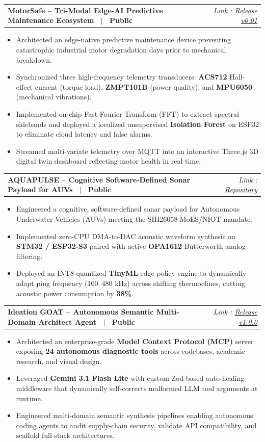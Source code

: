\documentclass[letterpaper,10pt]{article}
\makeatletter
\newcommand{\resumeProjectHeading}[2]{
  \vspace{-2pt}\item
    \begin{tabular*}{\linewidth}[t]{l@{\extracolsep{\fill}}r}
      \textbf{#1} & \textit{\small #2} \\
    \end{tabular*}\vspace{-3pt}
}
\newcommand{\resumeItemListStart}{\begin{itemize}[leftmargin=14pt, labelsep=4pt, itemsep=0.5pt, parsep=0pt]}
\newcommand{\resumeItemListEnd}{\end{itemize}\vspace{-3pt}}
\makeatother
\begin{document}
    \resumeProjectHeading
      {MotorSafe -- Tri-Modal Edge-AI Predictive Maintenance Ecosystem \ $|$ \ Public}{Link : \href{https://github.com/seeramsujay/motor-safe/releases/tag/v0.01}{Release v0.01}}
      \resumeItemListStart
        \item{Architected an edge-native predictive maintenance device preventing catastrophic industrial motor degradation days prior to mechanical breakdown.}
        \item{Synchronized three high-frequency telemetry transducers: \textbf{ACS712} Hall-effect current (torque load), \textbf{ZMPT101B} (power quality), and \textbf{MPU6050} (mechanical vibrations).}
        \item{Implemented on-chip Fast Fourier Transform (FFT) to extract spectral sidebands and deployed a localized unsupervised \textbf{Isolation Forest} on ESP32 to eliminate cloud latency and false alarms.}
        \item{Streamed multi-variate telemetry over MQTT into an interactive Three.js 3D digital twin dashboard reflecting motor health in real time.}
      \resumeItemListEnd

    \resumeProjectHeading
      {AQUAPULSE -- Cognitive Software-Defined Sonar Payload for AUVs \ $|$ \ Public}{Link : \href{https://github.com/seeramsujay/aqua-pulse}{Repository}}
      \resumeItemListStart
        \item{Engineered a cognitive, software-defined sonar payload for Autonomous Underwater Vehicles (AUVs) meeting the SIH26058 MoES/NIOT mandate.}
        \item{Implemented zero-CPU DMA-to-DAC acoustic waveform synthesis on \textbf{STM32 / ESP32-S3} paired with active \textbf{OPA1612} Butterworth analog filtering.}
        \item{Deployed an INT8 quantized \textbf{TinyML} edge policy engine to dynamically adapt ping frequency ($100\text{--}480\text{ kHz}$) across shifting thermoclines, cutting acoustic power consumption by \textbf{38\%}.}
      \resumeItemListEnd

    \resumeProjectHeading
      {Ideation GOAT -- Autonomous Semantic Multi-Domain Architect Agent \ $|$ \ Public}{Link : \href{https://github.com/seeramsujay/ideation-goat/releases/tag/v1.0.0}{Release v1.0.0}}
      \resumeItemListStart
        \item{Architected an enterprise-grade \textbf{Model Context Protocol (MCP)} server exposing \textbf{24 autonomous diagnostic tools} across codebases, academic research, and visual design.}
        \item{Leveraged \textbf{Gemini 3.1 Flash Lite} with custom Zod-based auto-healing middleware that dynamically self-corrects malformed LLM tool arguments at runtime.}
        \item{Engineered multi-domain semantic synthesis pipelines enabling autonomous coding agents to audit supply-chain security, validate API compatibility, and scaffold full-stack architectures.}
      \resumeItemListEnd
\end{document}
